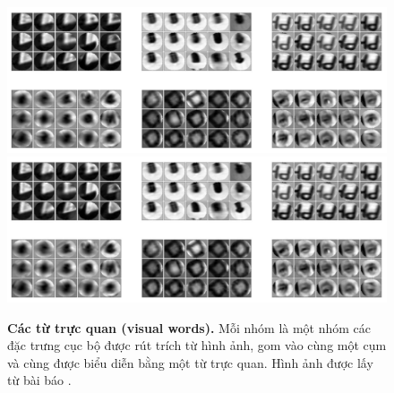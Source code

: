 \begin{figure}[!htbp]
  \begin{center}
    \leavevmode
    \ifpdf
      \includegraphics[scale=0.32]{visualWords}
    \else
      \includegraphics[scale=0.32]{visualWords}
    \fi
    \caption[Các từ trực quan (visual words)]{\textbf{Các từ trực quan (visual words).} Mỗi nhóm là một nhóm các đặc trưng cục bộ được rút trích từ hình ảnh, gom vào cùng một cụm và cùng được biểu diễn bằng một từ trực quan. Hình ảnh được lấy từ bài báo \citep{sivic2009efficient}.}
    \label{FigVisualWords}
  \end{center}
\end{figure}

